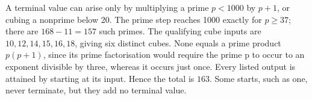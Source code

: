 A terminal value can arise only by multiplying a prime $p<1000$ by $p+1$, or cubing a nonprime below 20. The prime step reaches 1000 exactly for $p\ge37$; there are $168-11=157$ such primes. The qualifying cube inputs are $10,12,14,15,16,18$, giving six distinct cubes. None equals a prime product $p(p+1)$, since its prime factorisation would require the prime p to occur to an exponent divisible by three, whereas it occurs just once. Every listed output is attained by starting at its input. Hence the total is $\boxed{163}$. Some starts, such as one, never terminate, but they add no terminal value.
